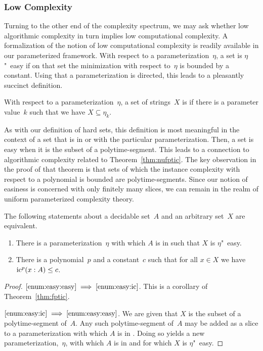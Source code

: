 \subsubsection{Low Complexity}
Turning to the other end of the complexity spectrum, we may ask whether low algorithmic complexity in turn implies low computational complexity.
A formalization of the notion of low computational complexity is readily available in our parameterized framework.
With respect to a parameterization~$\eta$, a set is $\eta$"~easy if on that set the minimization with respect to~$\eta$ is bounded by a constant.
Using that a parameterization is directed, this leads to a pleasantly succinct definition.
\begin{definition}
\label{def:easy}%
  With respect to a parameterization~$\eta$, a set of strings~$X$ is  if there is a parameter value~$k$ such that we have $X \subseteq \eta_k$.
\end{definition}
As with our definition of hard sets, this definition is most meaningful in the context of a set that is in  or  with the particular parameterization.
Then, a set is easy when it is the subset of a polytime-segment.
This leads to a connection to algorithmic complexity related to Theorem~\ref{thm:nufptic}.
The key observation in the proof of that theorem is that sets of which the instance complexity with respect to a polynomial is bounded are polytime-segments.
Since our notion of easiness is concerned with only finitely many slices, we can remain in the realm of uniform parameterized complexity theory.
\begin{theorem}
  The following statements about a decidable set~$A$ and an arbitrary set~$X$ are equivalent.
  \begin{enumerate}
  \item\label{enum:easy:easy}
    There is a parameterization~$\eta$ with which $A$ is in  such that $X$ is $\eta$"~easy.
  \item\label{enum:easy:ic}
    There is a polynomial~$p$ and a constant~$c$ such that for all $x \in X$ we have $\operatorname{ic}^p(x : A) \le c$.
  \end{enumerate}
\end{theorem}
\begin{proof}
$\ref{enum:easy:easy} \implies \ref{enum:easy:ic}$.
  This is a corollary of Theorem~\ref{thm:fptic}.

$\ref{enum:easy:ic} \implies \ref{enum:easy:easy}$.
  We are given that $X$ is the subset of a polytime-segment of~$A$.
  Any such polytime-segment of~$A$ may be added as a slice to a parameterization with which $A$ is in .
  Doing so yields a new parameterization,~$\eta$, with which $A$ is in  and for which $X$ is $\eta$"~easy.
\end{proof}

